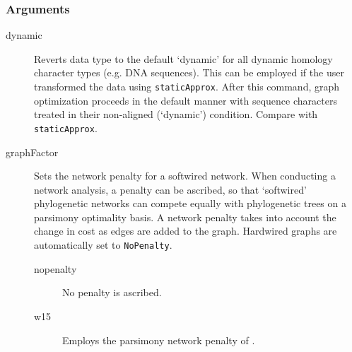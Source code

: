 	\subsubsection{Arguments}
	\begin{description}
			
			
		\item[dynamic] Reverts data type to the default `dynamic' for all dynamic homology 
		\citep{Wheeler2001} character types (e.g. DNA sequences). This can be employed 
		if the user transformed the data using \texttt{staticApprox}. After this command, 
		graph optimization proceeds in the default manner with sequence characters treated 
		in their non-aligned (`dynamic') condition. Compare with \texttt{staticApprox}.
			
			
		\item[graphFactor] Sets the network penalty for a softwired network. When conducting 
		a network analysis, a penalty can be ascribed, so that ‘softwired’ phylogenetic networks 
		can compete equally with phylogenetic trees on a parsimony optimality basis. A network 
		penalty takes into account the change in cost as edges are added to the graph. Hardwired 
		graphs are automatically set to \texttt{NoPenalty}.
			
		\begin{description}
			
			\item[nopenalty] No penalty is ascribed.	

			\item[w15] Employs the parsimony network penalty of \cite{Wheeler2015}.	
		

\end{description}
\end{description}
